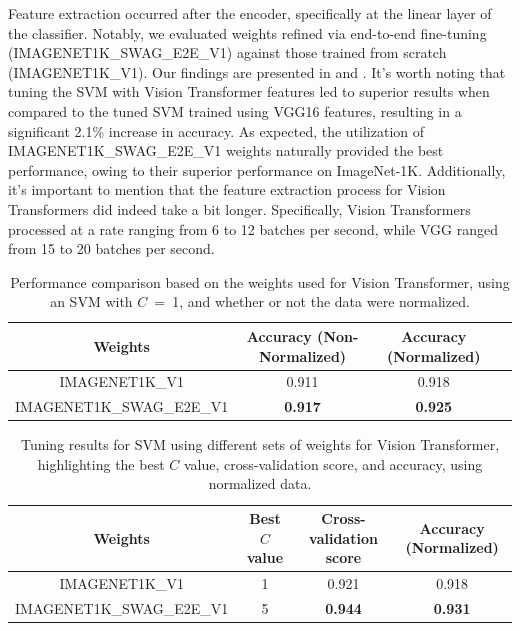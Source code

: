 Feature extraction occurred after the encoder, specifically at the linear layer of the classifier. Notably, we evaluated weights refined via end-to-end fine-tuning (IMAGENET1K\_SWAG\_E2E\_V1) against those trained from scratch (IMAGENET1K\_V1). Our findings are presented in  and . It's worth noting that tuning the SVM with Vision Transformer features led to superior results when compared to the tuned SVM trained using VGG16 features, resulting in a significant 2.1\% increase in accuracy. As expected, the utilization of IMAGENET1K\_SWAG\_E2E\_V1 weights naturally provided the best performance, owing to their superior performance on ImageNet-1K. Additionally, it's important to mention that the feature extraction process for Vision Transformers did indeed take a bit longer. Specifically, Vision Transformers processed at a rate ranging from 6 to 12 batches per second, while VGG ranged from 15 to 20 batches per second.

\begin{table}[H]
    \centering
    \begin{tabular}{@{}cccc@{}}
        \toprule
        \textbf{Weights}  & \textbf{Accuracy (Non-Normalized)} & \textbf{Accuracy (Normalized)} \\
        \midrule \midrule
        IMAGENET1K\_V1            & 0.911                              & 0.918             \\
        IMAGENET1K\_SWAG\_E2E\_V1 & \textbf{0.917}                     & \textbf{0.925}    \\
        \bottomrule
    \end{tabular}
    \caption{Performance comparison based on the weights used for Vision Transformer, using an SVM with $C$~=~1, and whether or not the data were normalized.}
    \label{tab:vit_transferlearning}
\end{table}

\begin{table}[H]
    \centering
    \begin{tabular}{@{}cccc@{}}
        \toprule
        \textbf{Weights} & \textbf{Best $C$ value} & \textbf{Cross-validation score} & \textbf{Accuracy (Normalized)} \\
        \midrule \midrule
        IMAGENET1K\_V1           & 1                       & 0.921                           & 0.918             \\
        IMAGENET1K\_SWAG\_E2E\_V1  & 5                       & \textbf{0.944}                  & \textbf{0.931}    \\
        \bottomrule
    \end{tabular}
    \caption{Tuning results for SVM using different sets of weights for Vision Transformer, highlighting the best $C$ value, cross-validation score, and accuracy, using normalized data.}
    \label{tab:vit_svm_tuned}
\end{table}